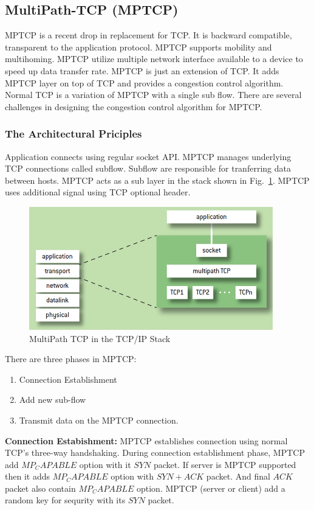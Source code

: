 \subsection{MultiPath-TCP (MPTCP)}
MPTCP\cite{scharf2013multipath} is a recent drop in replacement for TCP. It is backward compatible, transparent to the application protocol. MPTCP supports mobility and multihoming. MPTCP utilize multiple network interface available to a device to speed up data transfer rate. MPTCP is just an extension of TCP\cite{mptcpsurvey}. It adds MPTCP layer on top of TCP and provides a congestion control algorithm. Normal TCP is a variation of MPTCP with a single sub flow. There are several challenges in designing the congestion control algorithm for MPTCP.

\subsubsection{The Architectural Priciples}
Application connects using regular socket API. MPTCP manages underlying TCP connections called subflow. Subflow are responsible for tranferring data between hosts. MPTCP acts as a sub layer in the stack shown in Fig.~\ref{fig:mptcpstack}. MPTCP uses additional signal using TCP optional header.

\begin{figure}
\centering
\includegraphics{img/mptcp/paasch1}
\caption{MultiPath TCP in the TCP/IP Stack}
\label{fig:mptcpstack}
\end{figure}
There are three phases in MPTCP:
\begin{enumerate}
    \item Connection Establishment
    \item Add new sub-flow
    \item Transmit data on the MPTCP connection.
\end{enumerate}

\textbf{Connection Estabishment:}
MPTCP establishes connection using normal TCP's three-way handshaking. During connection establishment phase, MPTCP add $MP_CAPABLE$ option with it $SYN$ packet. If server is MPTCP supported then it adds $MP_CAPABLE$ option with $SYN+ACK$ packet. And final $ACK$ packet also contain $MP_CAPABLE$ option. MPTCP (server or client) add a random key for sequrity with its $SYN$ packet. 


